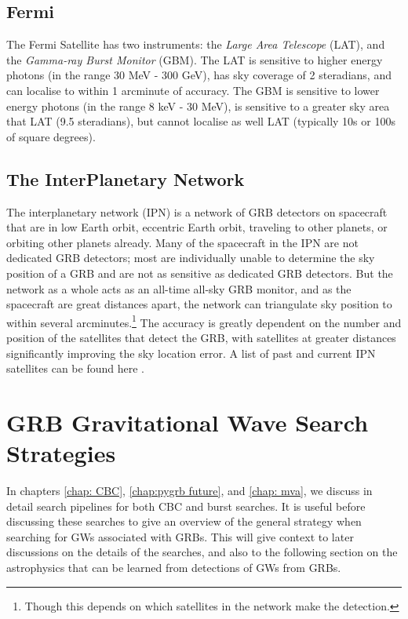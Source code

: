 \documentclass[11pt]{cuthesis}
\begin{document}
\subsection{Fermi}
The Fermi Satellite \cite{fermi} has two instruments: the \textit{Large Area Telescope} (LAT), and the \textit{Gamma-ray Burst Monitor} (GBM). The LAT is sensitive to higher energy photons (in the range 30 MeV - 300 GeV), has sky coverage of  2 steradians, and can localise to within 1 arcminute of accuracy. The GBM is sensitive to lower energy photons (in the range 8 keV - 30 MeV), is sensitive to a greater sky area that LAT (9.5 steradians), but cannot localise as well LAT (typically 10s or 100s of square degrees). 

\subsection{The InterPlanetary Network}
The interplanetary network (IPN) \cite{IPN} is a network of GRB detectors on spacecraft that are in low Earth orbit, eccentric Earth orbit, traveling to other planets, or orbiting other planets already. Many of the spacecraft in the IPN are not dedicated GRB detectors; most are individually unable to determine the sky position of a GRB and are not as sensitive as dedicated GRB detectors. But the network as a whole acts as an all-time all-sky GRB monitor, and as the spacecraft are great distances apart, the network can triangulate sky position to within several arcminutes.\footnote{Though this depends on which satellites in the network make the detection.} The accuracy is greatly dependent on the number and position of the satellites that detect the GRB, with satellites at greater distances significantly improving the sky location error. A list of past and current IPN satellites can be found here \cite{IPN_list}.

\section{GRB Gravitational Wave Search Strategies}
In chapters \ref{chap: CBC}, \ref{chap:pygrb future}, and \ref{chap: mva}, we discuss in detail search pipelines for both CBC and burst searches. It is useful before discussing these searches to give an overview of the general strategy when searching for GWs associated with GRBs. This will give context to later discussions on the details of the searches, and also to the following section on the astrophysics that can be learned from detections of GWs from GRBs. 
\end{document}
